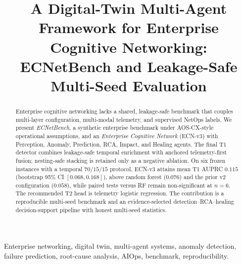 \documentclass[journal]{IEEEtran}
\begin{document}

\title{A Digital-Twin Multi-Agent Framework for Enterprise Cognitive Networking: ECNetBench and Leakage-Safe Multi-Seed Evaluation}

\author{%
}

\maketitle

\begin{abstract}
Enterprise cognitive networking lacks a shared, leakage-safe benchmark that couples multi-layer configuration, multi-modal telemetry, and supervised NetOps labels. We present \emph{ECNetBench}, a synthetic enterprise benchmark under AOS-CX-style operational assumptions, and an \emph{Enterprise Cognitive Network} (ECN-v3) with Perception, Anomaly, Prediction, RCA, Impact, and Healing agents. The final T1 detector combines leakage-safe temporal enrichment with anchored telemetry-first fusion; nesting-safe stacking is retained only as a negative ablation. On six frozen instances with a temporal $70/15/15$ protocol, ECN-v3 attains mean T1 AUPRC $0.115$ (bootstrap 95\% CI $[0.068,0.168]$), above random forest ($0.076$) and the prior v2 configuration ($0.058$), while paired tests versus RF remain non-significant at $n{=}6$. The recommended T2 head is telemetry logistic regression. The contribution is a reproducible multi-seed benchmark and an evidence-selected detection--RCA--healing decision-support pipeline with honest multi-seed statistics.
\end{abstract}

\begin{IEEEkeywords}
Enterprise networking, digital twin, multi-agent systems, anomaly detection, failure prediction, root-cause analysis, AIOps, benchmark, reproducibility.
\end{IEEEkeywords}










\end{document}
